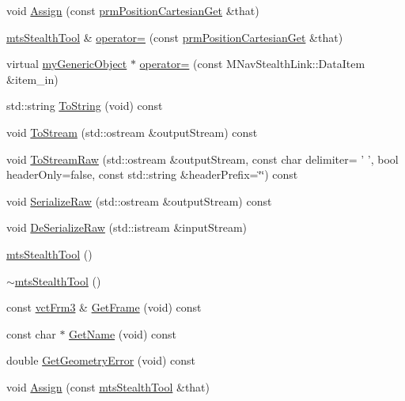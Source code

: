 \begin{DoxyCompactItemize}
void \hyperlink{classmts_stealth_tool_a371596656a661001c3691ae510dab17b}{Assign} (const \hyperlink{classprm_position_cartesian_get}{prm\-Position\-Cartesian\-Get} \&that)
\item 
\hyperlink{classmts_stealth_tool}{mts\-Stealth\-Tool} \& \hyperlink{classmts_stealth_tool_afd3d34f5974e9e9d182c0cf7b58b1c5e}{operator=} (const \hyperlink{classprm_position_cartesian_get}{prm\-Position\-Cartesian\-Get} \&that)
\item 
virtual \hyperlink{classmy_generic_object}{my\-Generic\-Object} $\ast$ \hyperlink{classmts_stealth_tool_a0e77e6a830e75276f11435b65f8fb376}{operator=} (const M\-Nav\-Stealth\-Link\-::\-Data\-Item \&item\-\_\-in)
\item 
std\-::string \hyperlink{classmts_stealth_tool_a18a31c80172f4f6280673c1db6ca8c5b}{To\-String} (void) const 
\item 
void \hyperlink{classmts_stealth_tool_a7550641c7e9eb89a5d1a77f4d48c47e9}{To\-Stream} (std\-::ostream \&output\-Stream) const 
\item 
void \hyperlink{classmts_stealth_tool_a6bfabcb3bee465c02dc9c42578dfd220}{To\-Stream\-Raw} (std\-::ostream \&output\-Stream, const char delimiter= ' ', bool header\-Only=false, const std\-::string \&header\-Prefix=\char`\"{}\char`\"{}) const 
\item 
void \hyperlink{classmts_stealth_tool_a1fa41dcc1d7260a3ddd7f2d5ea7732c9}{Serialize\-Raw} (std\-::ostream \&output\-Stream) const 
\item 
void \hyperlink{classmts_stealth_tool_ad346445c8f547aac0f99e869a585d90a}{De\-Serialize\-Raw} (std\-::istream \&input\-Stream)
\item 
\hyperlink{classmts_stealth_tool_aa883de2b768f98fec69a6bc857b78323}{mts\-Stealth\-Tool} ()
\item 
\hyperlink{classmts_stealth_tool_a86b22b54518d7c3535e85e17f71d9cad}{$\sim$mts\-Stealth\-Tool} ()
\item 
const \hyperlink{vct_transformation_types_8h_a81feda0a02c2d1bc26e5553f409fed20}{vct\-Frm3} \& \hyperlink{classmts_stealth_tool_a45f638dd4baf99c685c050a87323fd82}{Get\-Frame} (void) const 
\item 
const char $\ast$ \hyperlink{classmts_stealth_tool_a99340f0661adaa23eabaf43394360164}{Get\-Name} (void) const 
\item 
double \hyperlink{classmts_stealth_tool_a83bb8e4413f625850653416e374b6fee}{Get\-Geometry\-Error} (void) const 
\item 
void \hyperlink{classmts_stealth_tool_a16fe29f2e0b33e1f2249a32c3adcae4a}{Assign} (const \hyperlink{classmts_stealth_tool}{mts\-Stealth\-Tool} \&that)

\end{DoxyCompactItemize}

